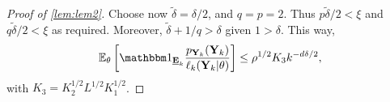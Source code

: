 \begin{proof}[Proof of \cref{lem:lem2}]

Choose now $\tilde\delta=\delta/2$, and $q=p=2$. Thus $p\tilde\delta/2<\xi$ and $q\tilde\delta/2<\xi$ as required. Moreover, $\tilde\delta+1/q>\delta$ given $1>\delta$. This way, %
    \begin{equation}
        \EE_\theta\left[ \indic_{\ubf E_k} \frac{p_{\mbf Y_k}(\mbf Y_k)}{\ell_k(\mbf Y_k|\theta)} \right] \leq \rho^{1/2} K_3 k^{-d\delta/2},
    \end{equation}
with $K_3 = K_2^{1/2}L^{1/2}K_1^{1/2}$.
    
\end{proof}







